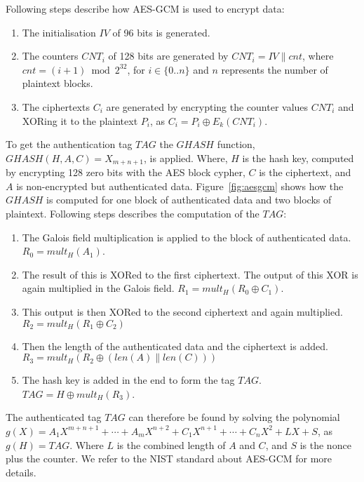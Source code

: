 Following steps describe how AES-GCM is used to encrypt data:

\begin{enumerate}
  \item The initialisation $IV$ of 96 bits is generated.
  \item The counters $CNT_i$ of 128 bits are generated by $CNT_i = IV \parallel
cnt$, where $cnt = (i + 1) \bmod{2^{32}}$, for $i \in\{0 .. n\}$ and $n$
represents the number of plaintext blocks.
  \item The ciphertexts $C_i$ are generated by encrypting the counter values
$CNT_i$ and XORing it to the plaintext $P_i$, as $C_i = P_i \oplus E_k(CNT_i)$.
\end{enumerate}

To get the authentication tag $TAG$ the $GHASH$ function,
$GHASH(H, A, C) = X_{m+n+1}$, is applied. Where, $H$ is the hash key, computed
by encrypting 128 zero bits with the AES block cypher, $C$ is the ciphertext,
and $A$ is non-encrypted but authenticated data. Figure~\ref{fig:aesgcm}
shows how the $GHASH$ is computed for one block of authenticated data and two
blocks of plaintext. Following steps describes the computation of the $TAG$:

\begin{enumerate}
  \item The Galois field multiplication is applied to the block of
authenticated data. $R_0 = mult_H(A_1)$.
  \item The result of this is XORed to the first ciphertext. The output
of this XOR is again multiplied in the Galois field. $R_1 = mult_H(R_0 \oplus
C_1)$.
  \item This output is then XORed to the second ciphertext and again
multiplied. $R_2 = mult_H(R_1 \oplus C_2)$
  \item Then the length of the authenticated data and the ciphertext is
added. $R_3 = mult_H(R_2 \oplus (len(A) \parallel len(C)))$
  \item The hash key is added in the end to form the tag $TAG$. $TAG = H \oplus
mult_H(R_3)$.
\end{enumerate}

The authenticated tag $TAG$ can therefore be found by solving the polynomial
$g(X) = A_{1}X^{m+n+1} + \cdots + A_{m}X^{n+2} + C_{1}X^{n+1} + \cdots +
C_{n}X^2 + LX + S$, as $g(H) = TAG$. Where $L$ is the combined length of $A$
and $C$, and $S$ is the nonce plus the counter. We refer to the NIST
standard about AES-GCM\cite{gcmnist} for more details.

